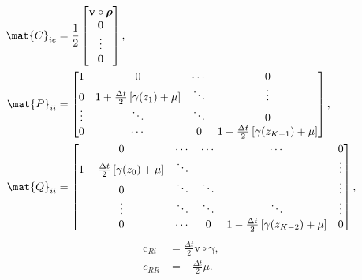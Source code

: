 \documentclass{jpmarticle}
\renewcommand{\vec}[1]{\boldsymbol{\mathrm{#1}}}
\begin{document}
\begin{equation}
  \begin{split}
    \mat{C}_{ie} &=
    \frac{1}{2}
    \begin{bmatrix}
      \vec{v} \circ \vec{\rho}
      \\
      \vec{0}
      \\
      \vdots
      \\
      \vec{0}
    \end{bmatrix},
    \\
    \mat{P}_{ii} &=
    \begin{bmatrix}
      1 & 0 & \cdots & 0
      \\
      0 & 1 + \frac{\Delta t}{2} \left[\gamma(z_1) + \mu\right] &
      \ddots & \vdots
      \\
      \vdots & \ddots & \ddots & 0
      \\
      0 & \cdots & 0 &
      1 + \frac{\Delta t}{2} \left[\gamma(z_{K - 1}) + \mu\right]
    \end{bmatrix},
    \\
    \mat{Q}_{ii} &=
    \begin{bmatrix}
      0 & \cdots & \cdots & \cdots & 0
      \\
      1 - \frac{\Delta t}{2} \left[\gamma(z_0) + \mu\right] & \ddots &
      & & \vdots
      \\
      0 & \ddots & \ddots & & \vdots
      \\
      \vdots & \ddots & \ddots & \ddots & \vdots
      \\
      0 & \cdots & 0 &
      1 - \frac{\Delta t}{2} \left[\gamma(z_{K - 2}) + \mu\right] & 0
    \end{bmatrix},
  \end{split}
\end{equation}
\begin{equation}
  \begin{split}
    \vec{c}_{Ri} &=
    \frac{\Delta t}{2} \vec{v} \circ \vec{\gamma},
    \\
    c_{RR} &=
    - \frac{\Delta t}{2} \mu.
  \end{split}
\end{equation}
\end{document}
